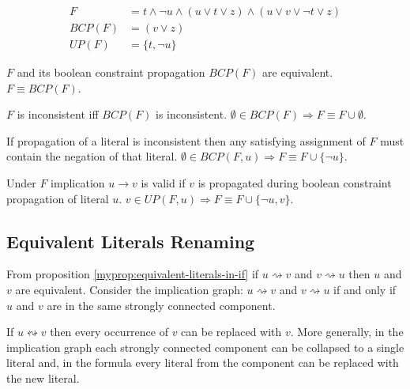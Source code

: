\begin{align}
  F &= t \land \neg u \land (u \lor t \lor z) \land (u \lor v \lor \neg t \lor z) \\
  BCP(F) &= (v \lor z) \\
  UP(F) &= \{ t, \neg u \}
\end{align}

\begin{myprop}
  $F$ and its boolean constraint propagation $BCP(F)$ are equivalent. $F \equiv BCP(F)$. 
\end{myprop}

\begin{myprop}
  $F$ is inconsistent iff $BCP(F)$ is inconsistent.
  $\emptyset \in BCP(F) \Rightarrow F \equiv F \cup \emptyset$.
\end{myprop}

\begin{myprop}
  If propagation of a literal is inconsistent then any satisfying
  assignment of $F$ must contain the negation of that literal.
  $\emptyset \in BCP(F, u) \Rightarrow F \equiv F \cup \{\neg u\}$.
\end{myprop}

\begin{myprop}
  Under $F$ implication $u \rightarrow v$ is valid if $v$ is propagated
  during boolean constraint propagation of literal $u$.
  $v \in UP(F, u) \Rightarrow F \equiv F \cup \{\neg u, v\}$.
\end{myprop}


\subsection{Equivalent Literals Renaming}
\label{ssec:eqlr}

From proposition \ref{myprop:equivalent-literals-in-if} if $u \rightsquigarrow v$
and $v \rightsquigarrow u$ then $u$ and $v$ are equivalent.
Consider the implication graph: $u \rightsquigarrow v$ and $v \rightsquigarrow u$
if and only if $u$ and $v$ are in the same strongly connected component.

\begin{myprop}
  If $u \leftrightsquigarrow v$ then every occurrence of $v$ can be replaced
  with $v$. More generally, in the implication graph each strongly
  connected component can be collapsed to a single literal and, in
  the formula every literal from the component can be replaced with
  the new literal.
\end{myprop}


